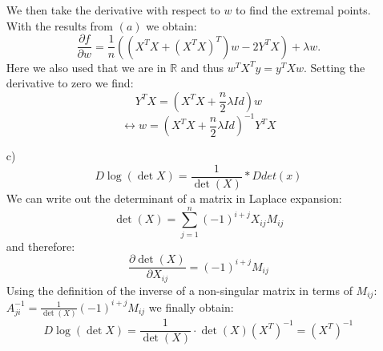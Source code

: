 \documentclass[10pt]{article}
\numberwithin{equation}{section}
\begin{document}
\begin{enumerate}
{$$$$
We then take the derivative with respect to $w$ to find the extremal points. With the results from $(a)$ we obtain:
$$
\frac{\partial f}{\partial w}=\frac{1}{n}( (X^TX + {(X^TX)}^T) w - 2Y^TX) + \lambda w.
$$
Here we also used that we are in $\mathbb{R}$ and thus $w^T X^Ty = y^TXw$. 
Setting the derivative to zero we find:
$$
Y^TX = \left( X^TX + \frac{n}{2}\lambda Id \right) w 
$$
$$
\leftrightarrow w = \left( X^TX + \frac{n}{2}\lambda Id \right)^{-1} Y^TX
$$}
\item[c)] {
$$D \log(\det{X}) = \frac{1}{\det(X)} * D det(x)$$
We can write out the determinant of a matrix in Laplace expansion:
$$
\det(X)= \sum_{j=1}^n (-1)^{i+j} X_{ij} M_{ij}
$$
and therefore:
$$
\frac{\partial \det(X)}{\partial X_{ij}} = (-1)^{i+j} M_{ij}
$$
Using the definition of the inverse of a non-singular matrix in terms of $M_{ij}$: $A^{-1}_{ji}= \frac{1}{\det(X)} (-1)^{i+j}M_{ij}$ we finally obtain:
$$
D \log(\det{X}) = \frac{1}{\det(X)} \cdot \det(X) \left({X^T}\right)^{-1} = \left({X^T}\right)^{-1} $$
}
\end{enumerate}
\end{document}

